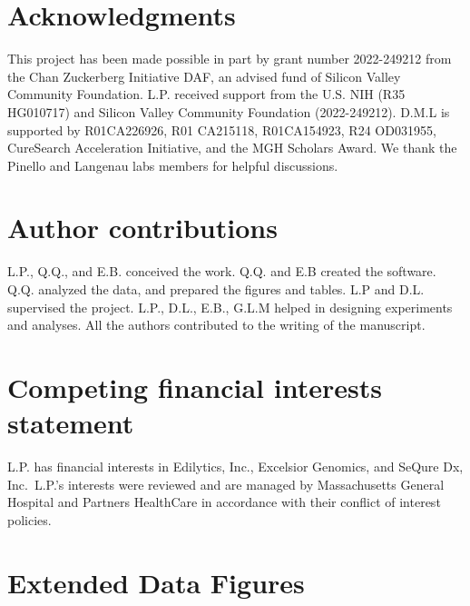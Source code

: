 \documentclass[
  sn-mathphys-num,
  lineno,
  twocolumn]{sn-jnl}
\begin{document}
\section*{Acknowledgments}\label{acknowledgments}

This project has been made possible in part by grant number 2022-249212
from the Chan Zuckerberg Initiative DAF, an advised fund of Silicon
Valley Community Foundation. L.P. received support from the U.S. NIH
(R35 HG010717) and Silicon Valley Community Foundation (2022-249212).
D.M.L is supported by R01CA226926, R01 CA215118, R01CA154923, R24
OD031955, CureSearch Acceleration Initiative, and the MGH Scholars
Award. We thank the Pinello and Langenau labs members for helpful
discussions.

\section*{Author contributions}\label{author-contributions}

L.P., Q.Q., and E.B. conceived the work. Q.Q. and E.B created the
software. Q.Q. analyzed the data, and prepared the figures and tables.
L.P and D.L. supervised the project. L.P., D.L., E.B., G.L.M helped in
designing experiments and analyses. All the authors contributed to the
writing of the manuscript.

\section*{Competing financial interests
statement}\label{competing-financial-interests-statement}

L.P. has financial interests in Edilytics, Inc., Excelsior Genomics, and
SeQure Dx, Inc.~L.P.'s interests were reviewed and are managed by
Massachusetts General Hospital and Partners HealthCare in accordance
with their conflict of interest policies.

\FloatBarrier
\clearpage

\newpage{}

\onecolumn

\section{Extended Data Figures}\label{extended-data-figures}
\end{document}
